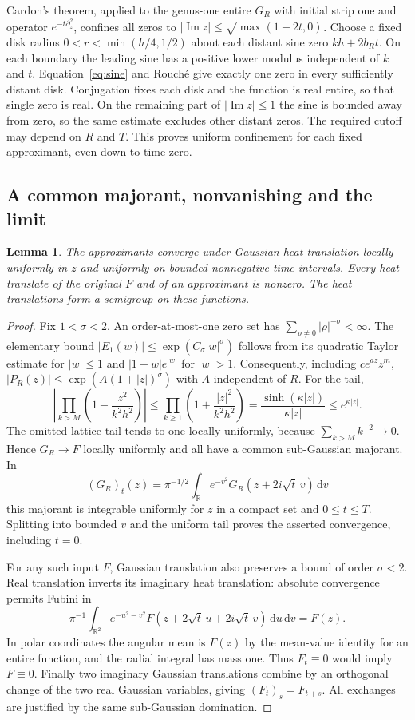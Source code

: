 \documentclass[11pt]{article}
\newtheorem{lemma}[theorem]{Lemma}
\theoremstyle{remark}\newtheorem{remark}[theorem]{Remark}
\newcommand{\Ima}{\operatorname{Im}}
\newcommand{\dd}{\mathrm{d}}
\begin{document}
Cardon's theorem, applied to the genus-one entire $G_R$ with initial
strip one and operator $e^{-t\partial_z^2}$, confines all zeros to
$|\Ima z|\le\sqrt{\max(1-2t,0)}$. Choose a fixed disk radius
$0<r<\min(h/4,1/2)$ about each distant sine zero $kh+2b_Rt$.
On each boundary the leading sine has a positive lower modulus
independent of $k$ and $t$. Equation~\eqref{eq:sine} and Rouch\'e
give exactly one zero in every sufficiently distant disk. Conjugation
fixes each disk and the function is real entire, so that single zero
is real. On the remaining part of $|\Ima z|\le1$ the sine is bounded
away from zero, so the same estimate excludes other distant zeros.
The required cutoff may depend on $R$ and $T$. This proves uniform
confinement for each fixed approximant, even down to time zero.

\subsection{A common majorant, nonvanishing and the limit}
\begin{lemma}\label{lem:heatlimit}
The approximants converge under Gaussian heat translation locally
uniformly in $z$ and uniformly on bounded nonnegative time intervals.
Every heat translate of the original $F$ and of an approximant is
nonzero. The heat translations form a semigroup on these functions.
\end{lemma}
\begin{proof}
Fix $1<\sigma<2$. An order-at-most-one zero set has
$\sum_{\rho\ne0}|\rho|^{-\sigma}<\infty$. The elementary bound
$|E_1(w)|\le\exp(C_\sigma|w|^\sigma)$ follows from its quadratic
Taylor estimate for $|w|\le1$ and $|1-w|e^{|w|}$ for $|w|>1$.
Consequently, including $ce^{az}z^m$,
$|P_R(z)|\le\exp(A(1+|z|)^\sigma)$ with $A$ independent of $R$.
For the tail,
\[
 \left|\prod_{k>M}\left(1-\frac{z^2}{k^2h^2}\right)\right|
 \le\prod_{k\ge1}\left(1+\frac{|z|^2}{k^2h^2}\right)
 =\frac{\sinh(\kappa|z|)}{\kappa|z|}\le e^{\kappa|z|}.
\]
The omitted lattice tail tends to one locally uniformly, because
$\sum_{k>M}k^{-2}\to0$. Hence $G_R\to F$ locally uniformly and
all have a common sub-Gaussian majorant. In
\[
 (G_R)_t(z)=\pi^{-1/2}\int_{\mathbb R} e^{-v^2}
               G_R(z+2i\sqrt t\,v)\,\dd v
\]
this majorant is integrable uniformly for $z$ in a compact set and
$0\le t\le T$. Splitting into bounded $v$ and the uniform tail proves
the asserted convergence, including $t=0$.

For any such input $F$, Gaussian translation also preserves a bound
of order $\sigma<2$. Real translation inverts its imaginary heat
translation: absolute convergence permits Fubini in
\[
 \pi^{-1}\int_{\mathbb R^2}e^{-u^2-v^2}
       F(z+2\sqrt t\,u+2i\sqrt t\,v)\,\dd u\,\dd v=F(z).
\]
In polar coordinates the angular mean is $F(z)$ by the mean-value
identity for an entire function, and the radial integral has mass one.
Thus $F_t\equiv0$ would imply $F\equiv0$. Finally two imaginary
Gaussian translations combine by an orthogonal change of the two real
Gaussian variables, giving $(F_t)_s=F_{t+s}$. All exchanges are
justified by the same sub-Gaussian domination.
\end{proof}
\end{document}
